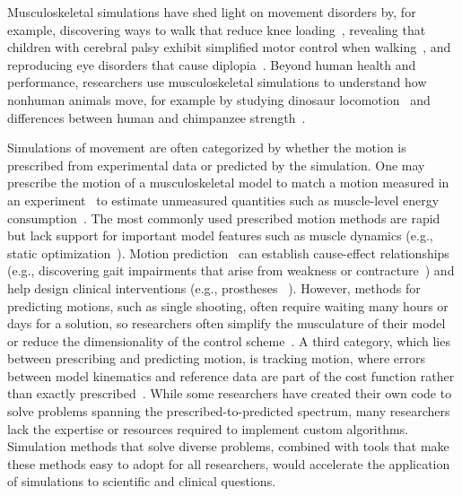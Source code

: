\documentclass[10pt,letterpaper]{article}
\providecommand{\DIFaddtex}[1]{{\protect\color{blue}\uwave{#1}}} %
\providecommand{\DIFaddbegin}{} %
\providecommand{\DIFaddend}{} %
\providecommand{\DIFadd}[1]{\texorpdfstring{\DIFaddtex{#1}}{#1}} %
\newcommand{\DIFaddincludegraphics}[2][]{{\color{blue}\fbox{\DIFOincludegraphics[#1]{#2}}}} %
\DeclareRobustCommand{\DIFaddbegin}{\DIFOaddbegin \let\includegraphics\DIFaddincludegraphics} %
\DeclareRobustCommand{\DIFaddend}{\DIFOaddend \let\includegraphics\DIFOincludegraphics} %
\begin{document}
Musculoskeletal simulations have shed light on movement disorders by, for example, discovering ways to walk that reduce knee loading~\cite{Fregly:2007ac}, revealing that children with cerebral palsy exhibit simplified motor control when walking~\cite{Steele:2015}, and reproducing eye disorders that cause diplopia~\cite{Priamikov:2016}. Beyond human health and performance, researchers use musculoskeletal simulations to understand how nonhuman animals move, for example by studying dinosaur locomotion~\cite{sthaya:2005uk} and differences between human and chimpanzee strength~\cite{ONeill:2017}.

Simulations of movement are often categorized by whether the motion is prescribed from experimental data or predicted by the simulation. One may prescribe the motion of a musculoskeletal model to match a motion measured in an experiment~\cite{Thelen:2003bba,Lloyd:2003} to estimate unmeasured quantities such as muscle-level energy consumption~\cite{Farris:2014du,Jackson:2017go}. The most commonly used prescribed motion methods are rapid but lack support for important model features such as muscle dynamics (e.g., static optimization~\cite{Prilutsky:2002}).
Motion prediction~\cite{Geijtenbeek:2019} can establish cause-effect relationships (e.g., discovering gait impairments that arise from weakness or contracture~\cite{Ong:2019}) and help design clinical interventions (e.g., prostheses~\cite{Handford:2016kd} \DIFaddbegin \DIFadd{and exoskeletons~\mbox{%
\cite{Millard:2017}}\hspace{0pt}%
}\DIFaddend ).
However, \DIFaddbegin \DIFadd{some }\DIFaddend methods for predicting motions, such as single shooting,  often require waiting many hours or days for a solution, so researchers often simplify the musculature of their model or reduce the dimensionality of the control scheme~\cite{Anderson:2001gv,Ong:2019}.
A third category, which lies between prescribing and predicting motion, is tracking motion, where errors between model kinematics and reference data are part of the cost function rather than exactly prescribed~\cite{Lin:2017jp}.
While some researchers have created their own code to solve problems spanning the prescribed-to-predicted spectrum, many researchers lack the expertise or resources required to implement custom algorithms.
Simulation methods that solve diverse problems, combined with tools that make these methods easy to adopt for all researchers, would accelerate the application of simulations to scientific and clinical questions.
\end{document}
